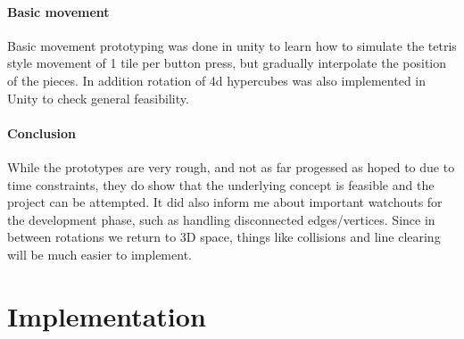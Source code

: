 \documentclass{article}
\begin{document}
\paragraph{Basic movement}
Basic movement prototyping was done in unity to learn how to simulate the tetris style movement of 1 tile per button press, but gradually interpolate the position of the pieces.
In addition rotation of 4d hypercubes was also implemented in Unity to check general feasibility.
\paragraph{Conclusion}
While the prototypes are very rough, and not as far progessed as hoped to due to time constraints, they do show that the underlying concept is feasible and the project can be attempted. It did also inform me about important watchouts for the development phase, such as handling disconnected edges/vertices. Since in between rotations we return to 3D space, things like collisions and line clearing will be much easier to implement.

\section{Implementation}
\end{document}
